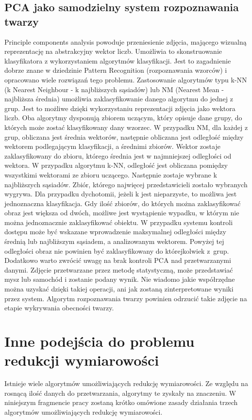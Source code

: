 \documentclass[oneside, eng]{mgr}
\begin{document}
\subsection{PCA jako samodzielny system rozpoznawania twarzy}
Principle components analysis powoduje przeniesienie zdjęcia, mającego wizualną reprezentację na abstrakcyjny wektor liczb. Umożliwia to skonstruowanie klasyfikatora z wykorzystaniem algorytmów klasyfikacji. Jest to zagadnienie dobrze znane w dziedzinie Pattern Recognition (rozpoznawania wzorców) i opracowano wiele rozwiązań tego problemu. Zastosowanie algorytmów typu k-NN (k Nearest Neighbour - k najbliższych sąsiadów) lub NM (Nearest Mean - najbliższa średnia) umożliwia zaklasyfikowanie danego algorytmu do jednej z grup. Jest to możliwe dzięki wykorzystaniu reprezentacji zdjęcia jako wektora liczb. Oba algorytmy dysponują zbiorem uczącym, który opisuje dane grupy, do których może zostać klasyfikowany dany wzorzec. 
W przypadku NM, dla każdej z grup, obliczana jest średnia wektorów, następnie obliczana jest odległość między wektorem podlegającym klasyfikacji, a średnimi zbiorów. Wektor zostaje zaklasyfikowany do zbioru, którego średnia jest w najmniejszej odległości od wektora. 
W przypadku algorytmu k-NN, odległość jest obliczana pomiędzy wszystkimi wektorami ze zbioru uczącego. Następnie zostaje wybrane k najbliższych sąsiadów. Zbiór, którego najwięcej przedstawicieli zostało wybranych wygrywa. Dla przypadku dychotomii, jeżeli k jest nieparzyste, to możliwa jest jednoznaczna klasyfikacja. Gdy ilość zbiorów, do których można zaklasyfikować obraz jest większa od dwóch, możliwe jest wystąpienie wypadku, w którym nie można jednoznacznie zaklasyfikować obiektu. 
W przypadku systemu kontroli dostępu może być wskazane wprowadzenie maksymalnej odległości między średnią lub najbliższym sąsiadem, a analizowanym wektorem. Powyżej tej odległości obraz nie powinien być zaklasyfikowany do którejkolwiek z~grup. 
Dodatkowo warto zwrócić uwagę na brak kontroli PCA nad przetwarzanymi danymi. Zdjęcie przetwarzane przez metodę statystyczną, może przedstawiać mysz lub samochód i zostanie podany wynik. Nie wiadomo jakie współrzędne można uzyskać dzięki takiej operacji, ani jak zostaną zinterpretowane wyniki przez system. Algorytm rozpoznawania twarzy powinien odrzucić takie zdjęcie na etapie wykrywania obecności twarzy.

\section{Inne podejścia do problemu redukcji wymiarowości}
Istnieje wiele algorytmów umożliwiających redukcję wymiarowości. Ze względu na rosnącą ilość danych do przetwarzania, algorytmy te zyskały na znaczeniu. W niniejszym fragmencie pracy zostaną krótko omówione zasady działania trzech algorytmów umożliwiających redukcję wymiarowości.
\end{document}
